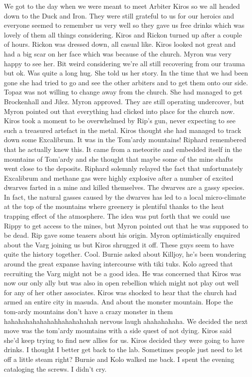 We got to the day when we were meant to meet Arbiter Kiros so we all headed down to the Duck and Iron. They were still grateful to us for our heroics and everyone seemed to remember us very well so they gave us free drinks which was lovely of them all things considering. Kiros and Rickon turned up after a couple of hours. Rickon was dressed down, all casual like. Kiros looked not great and had a big scar on her face which was because of the church. Myron was very happy to see her. Bit weird considering we’re all still recovering from our trauma but ok. Was quite a long hug. She told us her story. In the time that we had been gone she had tried to go and see the other arbiters and to get them onto our side. Topaz was not willing to change away from the church. She had managed to get Brockenhall and Jilez. Myron approved. They are still operating undercover, but Myron pointed out that everything had clicked into place for the church now. Kiros took a moment to be overwhelmed by Rip’s gun, never expecting to see such a treasured artefact in the metal. Kiros thought she had managed to track down some Excalibrum. It was in the Tom’ardy mountains! Riphard remembered that he actually knew this. It came from a meteorite and embedded itself in the mountains of Tom’ardy and she thought that maybe some of the mine shafts went close to the deposits. Riphard solemnly relayed the fact that unfortunately Excalibrum and methane gas were highly explosive after a number of excited dwarves farted in a mine and killed themselves. The dwarves are a gassy species. In fact, the natural gasses caused by the dwarves has led to a local micro-climate at the top of the mountains where greenery is plentiful thanks to the heat trapping effect of the atmosphere. The idea was put forth that we could use Rippy to get access to the mines, but Myron pointed out that he was supposed to be dead. Rip gave some teasers about his origin. Myron optimistically enquired about the Varg joining us but Kiros shrugged it off. These guys seem to have quite the history together. Cool. Burnie asked about Killjoy, he’s been wondering around the great expanse having intercourse with tiki tuks. Kolo agreed that recruiting the Varg might not be a good idea. He was concerned that Kiros was now our only ally but was also in open rebellion which might not play out well for any of her other associates. Kiros was shocked to hear that the church had armed an entire city in masuda. And about the monster mountain. Hope the tom-ardy mountains don’t have a crazy monster in them hahahahahahahahhahahahahah nervous laugh ahahahahaha. We decided the next move was the tom’ardy mountains with a side quest of not dying. Kiros said she’d keep trying to find new allies for us. Kiros decided they were going to have drinks. I thought I better get back to the lab. Sometimes people just need to let off a little steam right? Burnie and Kolo walked me back. I spent the evening cataloging the screws. I didn’t cry.\medskip

